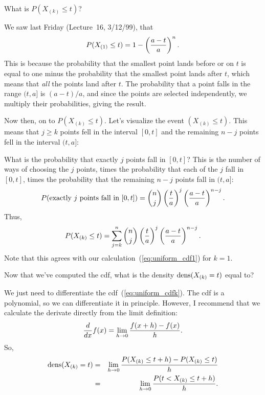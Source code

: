 \medskip

What is $P(X_{(k)} \leq t)$?

We saw last Friday (Lecture~16, 3/12/99), that 
\begin{equation}
  P(X_{(1)}\leq t) = 1 - \left(\frac{a-t}{a}\right)^n.
\label{eq:uniform_cdf1}
\end{equation}
This is because the probability that the smallest point lands before or
on $t$ is
equal to one minus the probability that the smallest point lands after
$t$, which means that {\em all} the points land after $t$.
The probability that a point falls in the range $(t,a]$ is $(a-t)/a$,
and since the points are selected independently, we multiply their
probabilities, giving the result.

Now then, on to $P(X_{(k)}\leq t)$.  Let's visualize the event
$(X_{(k)}\leq t)$.
This means that $j\geq k$ points fell in the interval $[0,t]$ and the
remaining $n-j$ points fell in the interval $(t,a]$: 
\begin{center}
\mbox{}
\end{center}
What is the probability that exactly $j$ points fall in $[0,t]$?
This is the number of ways of choosing the $j$ points, times the
probability that each of the $j$ fall in $[0,t]$, times the probability
that the remaining $n-j$ points fall in $(t,a]$:
\[
  P(\mbox{exactly $j$ points fall in $[0,t]$}) =
  {n\choose j}\left(\frac{t}{a}\right)^j\left(\frac{a-t}{a}\right)^{n-j}.
\]
Thus,
\begin{equation}
   P(X_{(k)}\leq t) = \sum_{j=k}^n
	  {n\choose j}\left(\frac{t}{a}\right)^j\left(\frac{a-t}{a}\right)^{n-j}.
\label{eq:uniform_cdfk}
\end{equation}
Note that this agrees with our calculation~(\ref{eq:uniform_cdf1}) for
$k=1$. 
\QED

\medskip

Now that we've computed the cdf, what is the density 
$\mbox{dens}(X_{(k)} = t)$ equal to?

We just need to differentiate the cdf~(\ref{eq:uniform_cdfk}).  
The cdf is a polynomial, so we can differentiate it in
principle.
However, I recommend that we calculate the derivate directly from the
limit definition:
\[
  \frac{d}{dx}f(x) = \lim_{h\rightarrow 0} \frac{f(x+h)-f(x)}{h}.
\]
So,
\begin{eqnarray}
\mbox{dens}(X_{(k)} = t) 
& = &
\lim_{h\rightarrow 0} \frac{P(X_{(k)}\leq t+h)-P(X_{(k)}\leq t)}{h}
  \nonumber \\  
& = &
\lim_{h\rightarrow 0} \frac{P(t< X_{(k)}\leq t+h)}{h}.  
\label{eq:derivative}
\end{eqnarray}

